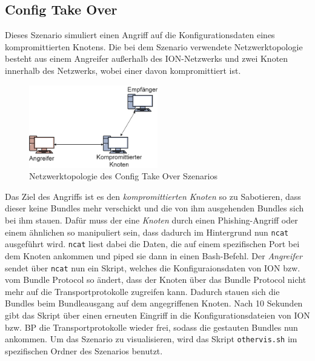 \documentclass{article}
\begin{document}
\subsection{Config Take Over}
Dieses Szenario simuliert einen Angriff auf die Konfigurationsdaten eines kompromittierten Knotens. Die bei dem Szenario verwendete Netzwerktopologie besteht aus einem Angreifer außerhalb des ION-Netzwerks und zwei Knoten innerhalb des Netzwerks, wobei einer davon kompromittiert ist.
\par
\begin{figure}[h]
\centering
\includegraphics[width=0.5\textwidth]{cto}
\caption{Netzwerktopologie des Config Take Over Szenarios}
\end{figure}
Das Ziel des Angriffs ist es den \textit{kompromittierten Knoten} so zu Sabotieren, dass dieser keine Bundles mehr verschickt und die von ihm ausgehenden Bundles sich bei ihm stauen.
Dafür muss der eine \textit{Knoten} durch einen Phishing-Angriff oder einem ähnlichen so manipuliert sein, dass dadurch im Hintergrund nun \texttt{ncat} ausgeführt wird. \texttt{ncat} liest dabei die Daten, die auf einem spezifischen Port bei dem Knoten ankommen und piped sie dann in einen Bash-Befehl.
Der \textit{Angreifer} sendet über \texttt{ncat} nun ein Skript, welches die Konfiguraionsdaten von ION bzw. vom Bundle Protocol so ändert, dass der Knoten über das Bundle Protocol nicht mehr auf die Transportprotokolle zugreifen kann. Dadurch stauen sich die Bundles beim Bundleausgang auf dem angegriffenen Knoten.
Nach 10 Sekunden gibt das Skript über einen erneuten Eingriff in die Konfigurationsdateien von ION bzw. BP die Transportprotokolle wieder frei, sodass die gestauten Bundles nun ankommen.
Um das Szenario zu visualisieren, wird das Skript \texttt{othervis.sh} im spezifischen Ordner des Szenarios benutzt.
\end{document}
